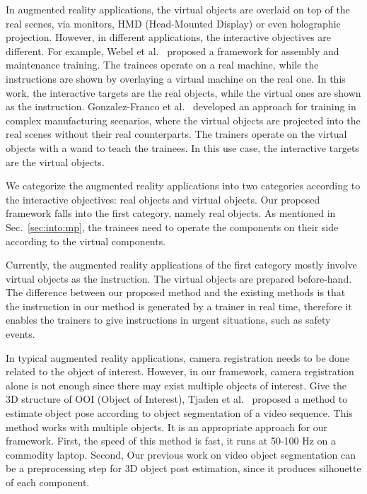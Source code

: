 In augmented reality applications, the virtual objects are overlaid on top of the real scenes, via monitors, HMD (Head-Mounted Display) or even holographic projection. However, in different applications, the interactive objectives are different. For example, Webel et al.~\cite{webel2011} proposed a framework for assembly and maintenance training. The trainees operate on a real machine, while the instructions are shown by overlaying a virtual machine on the real one. In this work, the interactive targets are the real objects, while the virtual ones are shown as the instruction. Gonzalez-Franco et al.~\cite{gonzalez-franco2016} developed an approach for training in complex manufacturing scenarios, where the virtual objects are projected into the real scenes without their real counterparts. The trainers operate on the virtual objects with a wand to teach the trainees. In this use case, the interactive targets are the virtual objects.

We categorize the augmented reality applications into two categories according to the interactive objectives: real objects and virtual objects. Our proposed framework falls into the first category, namely real objects. As mentioned in Sec.~\ref{sec:into:mp}, the trainees need to operate the components on their side according to the virtual components.

Currently, the augmented reality applications of the first category mostly involve virtual objects as the instruction. The virtual objects are prepared before-hand.
The difference between our proposed method and the existing methods is that the instruction in our method is generated by a trainer in real time, therefore it enables the trainers to give instructions in urgent situations, such as safety events.

In typical augmented reality applications, camera registration needs to be done related to the object of interest. However, in our framework, camera registration alone is not enough since there may exist multiple objects of interest.
Give the 3D structure of OOI (Object of Interest), Tjaden et al.~\cite{tjaden2016} proposed a method to estimate object pose according to object segmentation of a video sequence. This method works with multiple objects.
It is an appropriate approach for our framework. First, the speed of this method is fast, it runs at 50-100 Hz on a commodity laptop. Second, Our previous work on video object segmentation can be a preprocessing step for 3D object post estimation, since it produces silhouette of each component.

